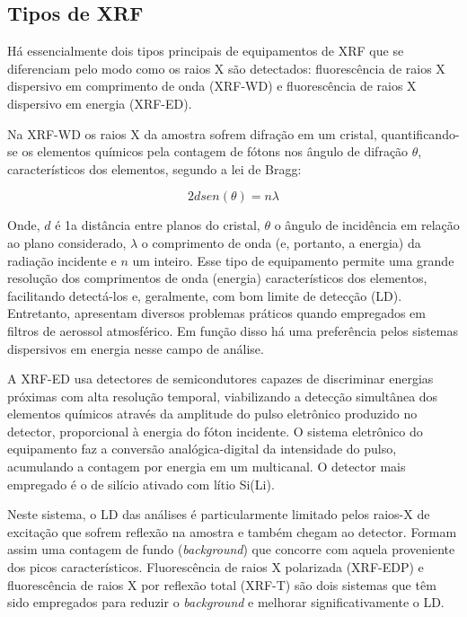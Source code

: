 \subsection{Tipos de XRF}

Há essencialmente dois tipos principais de equipamentos de XRF que se 
diferenciam pelo modo como os raios X são detectados: fluorescência de raios 
X dispersivo em comprimento de onda (XRF-WD) e fluorescência de raios X 
dispersivo em energia (XRF-ED).

Na XRF-WD os raios X da amostra sofrem difração em um cristal, quantificando-se
os elementos químicos pela contagem de fótons nos ângulo de difração $\theta$, 
característicos dos elementos, segundo a lei de Bragg:

\begin{equation}
	\label{eq:bragg}
	2d sen(\theta) = n \lambda
\end{equation}

Onde, $d$ é 1a distância entre planos do cristal, $\theta$ o ângulo de incidência 
em relação ao plano considerado, $\lambda$ o comprimento de onda 
(e, portanto, a energia) da radiação incidente e $n$ um inteiro.
Esse tipo de equipamento permite uma grande resolução dos comprimentos de onda 
(energia) característicos dos elementos, facilitando detectá-los e, geralmente, 
com bom limite de detecção (LD).
Entretanto, apresentam diversos problemas práticos quando empregados em filtros 
de aerossol atmosférico. Em função disso há uma preferência pelos sistemas 
dispersivos em energia nesse campo de análise. 

A XRF-ED usa detectores de semicondutores capazes de discriminar energias 
próximas com alta resolução temporal, viabilizando a detecção simultânea dos 
elementos químicos através da amplitude do pulso eletrônico produzido no 
detector, proporcional à energia do fóton incidente. O sistema eletrônico do 
equipamento faz a conversão analógica-digital da intensidade do pulso, 
acumulando a contagem por energia em um multicanal. O detector mais empregado é 
o de silício ativado com lítio Si(Li). 

Neste sistema, o LD das análises é particularmente limitado pelos raios-X de 
excitação que sofrem reflexão na amostra e também chegam ao detector. 
Formam assim uma contagem de fundo (\textit{background}) que concorre com 
aquela proveniente dos picos característicos. 
Fluorescência de raios X polarizada (XRF-EDP) e fluorescência de raios X por 
reflexão total (XRF-T) são dois sistemas que têm sido empregados 
para reduzir o \textit{background} e melhorar significativamente o LD.

